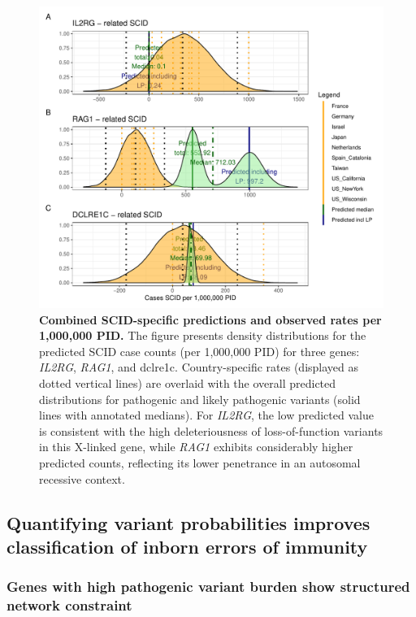 \begin{figure}[h]
  \centering
  \includegraphics[width=.6\textwidth]{../images/validation_studies_scid_combined_plot.pdf}
  \caption{\textbf{Combined SCID-specific predictions and observed rates per 1,000,000 PID.}
    The figure presents density distributions for the predicted SCID case counts (per 1,000,000 PID) for three genes: \textit{IL2RG}, \textit{RAG1}, and \ac{dclre1c}. Country-specific rates (displayed as dotted vertical lines) are overlaid with the overall predicted distributions for pathogenic and likely pathogenic variants (solid lines with annotated medians). For \textit{IL2RG}, the low predicted value is consistent with the high deleteriousness of loss-of-function variants in this X-linked gene, while \textit{RAG1} exhibits considerably higher predicted counts, reflecting its lower penetrance in an autosomal recessive context.}
  \label{fig:scid_combined}
\end{figure}

\clearpage

\subsection{Quantifying variant probabilities improves classification of inborn errors of immunity}
\subsubsection{Genes with high pathogenic variant burden show structured network constraint}

